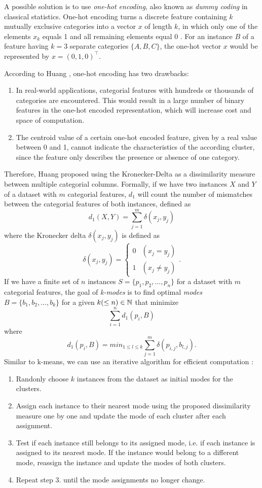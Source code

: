 A possible solution is to use \textit{one-hot encoding}, also known as \textit{dummy coding} in classical statistics. One-hot encoding turns a discrete feature containing $k$ mutually exclusive categories into a vector $x$ of length $k$, in which only one of the elements $x_k$ equals 1 and all remaining elements equal 0 \cite{pattern_recognition_machine_learning}. For an instance $B$ of a feature having $k=3$ separate categories $\{A, B, C\}$, the one-hot vector $x$ would be represented by $x = (0, 1, 0)^{\intercal}$.

According to Huang \cite{kmodes}, one-hot encoding has two drawbacks:
\begin{enumerate} 
	\item In real-world applications, categorial features with hundreds or thousands of categories are encountered. This would result in a large number of binary features in the one-hot encoded representation, which will increase cost and space of computation.
	\item The centroid value of a certain one-hot encoded feature, given by a real value between 0 and 1, cannot indicate the characteristics of the according cluster, since the feature only describes the presence or absence of one category.
\end{enumerate}
Therefore, Huang \cite{kmodes} proposed using the Kronecker-Delta as a dissimilarity measure between multiple categorial columns. Formally, if we have two instances $X$ and $Y$ of a dataset with $m$ categorial features, $d_1$ will count the number of mismatches between the categorial features of both instances, defined as
$$d_1(X, Y) = \sum^m_{j=1} \delta (x_j, y_j)$$
where the Kronecker delta $\delta (x_j, y_j)$ is defined as
$$\delta (x_j, y_j) = 
\begin{cases}
    0 & (x_j = y_j)\\
    1 & (x_j \neq y_j)
\end{cases}.
$$
If we have a finite set of $n$ instances $S=\{p_1, p_2, ..., p_n\}$ for a dataset with $m$ categorial features, the goal of \textit{k-modes} \cite{kmodes} is to find optimal \textit{modes} $B=\{b_1, b_2, ..., b_k\}$ for a given $k (\leq n) \in \mathbb{N}$ that minimize
$$\sum_{i=1}^n  d_1(p_i, B)$$
where
$$d_1(p_i, B) = min_{1 \leq l \leq k} \sum^m_{j=1} \delta (p_{i,j}, b_{l,j}).$$
Similar to k-means, we can use an iterative algorithm for efficient computation \cite{kmodes}:
\begin{enumerate} 
	\item Randonly choose $k$ instances from the dataset as initial modes for the clusters.
	\item Assign each instance to their nearest mode using the proposed dissimilarity measure one by one and update the mode of each cluster after each assignment.
	\item Test if each instance still belongs to its assigned mode, i.e. if each instance is assigned to its nearest mode. If the instance would belong to a different mode, reassign the instance and update the modes of both clusters.
	\item Repeat step 3. until the mode assignments no longer change.
\end{enumerate}

